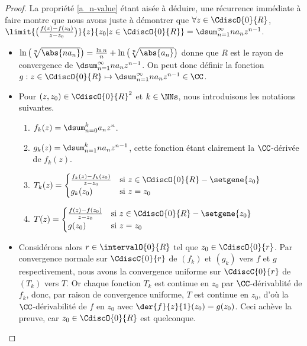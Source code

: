 \begin{proof}
	La propriété \ref{a_n-value} étant aisée à déduire, une récurrence immédiate à faire montre que nous avons juste à démontrer que
	$\forall z \in \CdiscO{0}{R}$,
	$ \limit{\big( \frac{f(z) - f(z_0)}{z - z_0} \big)}%
	        {z}{z_0 | z \in \CdiscO{0}{R}}
	= \dsum_{n = 1}^{\infty} n a_n z^{n - 1}$.
	\begin{itemize}
		\item
		$ \ln \big( \sqrt[n]{\abs{n a_n}} \big)
		= \frac{\ln n}{n} + \ln \big( \sqrt[n]{\abs{a_n}} \big)$
		donne que
		$R$ est le rayon de convergence de
		$\dsum_{n = 1}^{\infty} n a_n z^{n - 1}$.
		On peut donc définir la fonction $g: z \in \CdiscO{0}{R} \mapsto \dsum_{n = 1}^{\infty} n a_n z^{n - 1} \in \CC$.


		\item Pour $(z , z_0) \in \CdiscO{0}{R}^2$ et $k \in \NNs$, nous introduisons les notations suivantes.
        \begin{enumerate}[label=(\alph*)]
	        \item $f_k(z) = \dsum_{n = 0}^{k} a_n z^n$.

	        \item $g_k(z) = \dsum_{n = 1}^{k} n a_n z^{n-1}$,
	        cette fonction étant clairement la $\CC$-dérivée de $f_k(z)$.

	        \item $T_k(z) =
			\begin{cases}
	    		\frac{f_k(z) - f_k(z_0)}{z - z_0}  & \text{si $z \in \CdiscO{0}{R} - \setgene{z_0}$} \\
	   			g_k(z_0)                           & \text{si $z = z_0$}
	 		\end{cases}$

	        \item $T(z) =
			\begin{cases}
	    		\frac{f(z) - f(z_0)}{z - z_0}  & \text{si $z \in \CdiscO{0}{R} - \setgene{z_0}$} \\
	   			g(z_0)                         & \text{si $z = z_0$}
	 		\end{cases}$
	    \end{enumerate}


		\item Considérons alors $r \in \intervalO{0}{R}$ tel que $z_0 \in \CdiscO{0}{r}$.
		Par convergence normale sur $\CdiscC{0}{r}$ de $(f_k)$ et $(g_k)$ vers $f$ et $g$ respectivement,
		nous avons la convergence uniforme sur $\CdiscC{0}{r}$ de $(T_k)$ vers $T$. 
		Or chaque fonction $T_k$ est continue en $z_0$ par $\CC$-dérivablité de $f_k$, donc, par raison de convergence uniforme, $T$ est continue en $z_0$,
		d'où
		la $\CC$-dérivabilité de  $f$ en $z_0$ avec $\der{f}{z}{1}(z_0) = g(z_0)$.
		Ceci achève la preuve, car $z_0 \in \CdiscO{0}{R}$ est quelconque.
	\end{itemize}
\end{proof}


